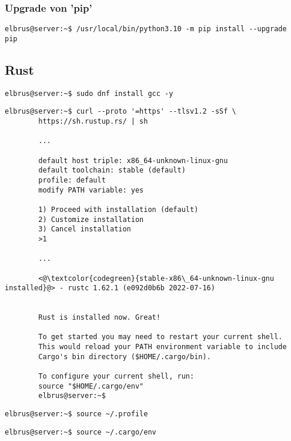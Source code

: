\documentclass{article}
\begin{document}
	\subsubsection{Upgrade von 'pip'}
	\begin{lstlisting}[caption={Upgraden von 'pip'.}]
		elbrus@server:~$ /usr/local/bin/python3.10 -m pip install --upgrade pip
	\end{lstlisting}

	\subsection{Rust}
	
	\begin{lstlisting}[caption={Installieren von GNU Compiler Collection.}]
		elbrus@server:~$ sudo dnf install gcc -y
	\end{lstlisting}
	
	\lstset{style=commands}
	\begin{lstlisting}[caption={Installieren von Rust.}]
		elbrus@server:~$ curl --proto '=https' --tlsv1.2 -sSf \
		https://sh.rustup.rs/ | sh
		 
		...
		 
		default host triple: x86_64-unknown-linux-gnu
		default toolchain: stable (default)
		profile: default
		modify PATH variable: yes
		
		1) Proceed with installation (default)
		2) Customize installation
		3) Cancel installation
		>1
		
		...
		
		<@\textcolor{codegreen}{stable-x86\_64-unknown-linux-gnu installed}@> - rustc 1.62.1 (e092d0b6b 2022-07-16)
		
		
		Rust is installed now. Great!
		
		To get started you may need to restart your current shell.
		This would reload your PATH environment variable to include
		Cargo's bin directory ($HOME/.cargo/bin).
		
		To configure your current shell, run:
		source "$HOME/.cargo/env"
		elbrus@server:~$
	\end{lstlisting}

	\begin{lstlisting}[caption={Laden der Variablen aus dem Terminal Profil.}]
		elbrus@server:~$ source ~/.profile
	\end{lstlisting}

	\begin{lstlisting}[caption={Hinzufügen des Befehls Cargo zu dem Pfad.}]
		elbrus@server:~$ source ~/.cargo/env
	\end{lstlisting}
\end{document}

